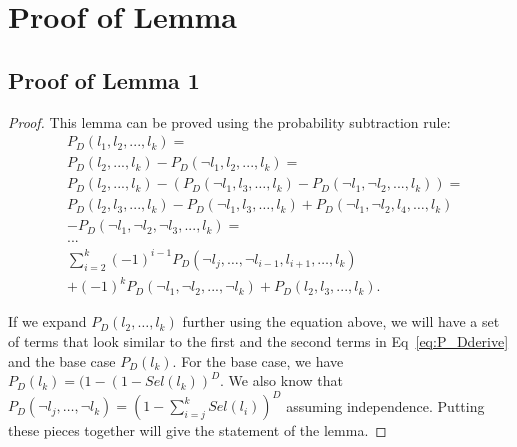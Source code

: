 \documentclass{sigmod}
\begin{document}
\section{Proof of Lemma}
\subsection{Proof of Lemma 1}
\begin{proof}
This lemma can be proved using the probability subtraction rule:
\begin{align}
&P_D(l_1, l_2, ..., l_k) = \nonumber \\
&P_D(l_2, ...,l_k) - P_D(\neg l_1, l_2, ..., l_k)= \nonumber \\
&P_D(l_2, ...,l_k) - (P_D(\neg l_1, l_3, \ldots, l_k) - P_D(\neg l_1, \neg l_2, ..., l_k))= \nonumber \\
&P_D(l_2, l_3, ...,l_k) - P_D(\neg l_1, l_3, \ldots, l_k) + P_D(\neg l_1, \neg l_2, l_4, \ldots, l_k) \nonumber \\
&- P_D(\neg l_1, \neg l_2, \neg l_3, ..., l_k)= \nonumber\\
&...\nonumber\\
&\sum_{i=2}^k (-1)^{i-1}P_D(\neg l_j,\ldots,\neg l_{i-1}, l_{i+1}, \ldots, l_k)\nonumber\\
&+ (-1)^k P_D(\neg l_1, \neg l_2, ..., \neg l_k) + P_D(l_2, l_3, ...,l_k).
\label{eq:P_Dderive}
\end{align}
 
If we expand $P_D(l_2,\ldots,l_k)$ further using the equation above, we will have a set of terms that look similar to the first and the second terms in Eq~\ref{eq:P_Dderive} and the base case $P_D(l_k)$. For the base case, we have $P_D(l_k)=(1-(1-Sel(l_k))^D$. We also know that $P_D(\neg l_j, \ldots, \neg l_k)=(1-\sum_{i=j}^k Sel(l_i))^D$ assuming independence. Putting these pieces together will give the statement of the lemma.

\end{proof}
\end{document}
